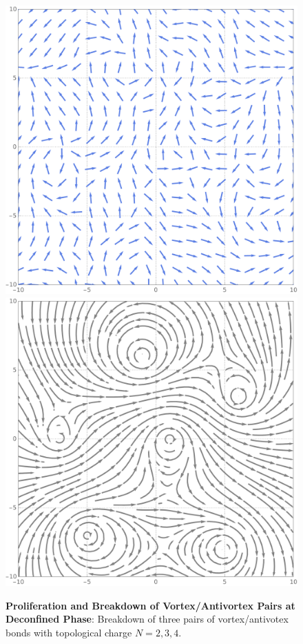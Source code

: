 \documentclass[10pt,nofootinbib]{revtex4}
\begin{document}
		\begin{figure}[!htp]
			\centering
			\includegraphics[scale=0.2]{spin2.pdf}
			\includegraphics[scale=0.2]{vector2.pdf}
			\caption{{\bf Proliferation and Breakdown of Vortex/Antivortex Pairs at Deconfined Phase}: Breakdown of three pairs of vortex/antivotex bonds with topological charge $N=2,3,4$.}
			\label{fig:2}
		\end{figure}
		
\end{document}

